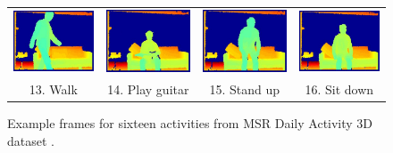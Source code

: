 \documentclass[final,3p,times,twocolumn]{elsarticle}
\begin{document}
\begin{figure}[t]
{\begin{tabular}{cccc}
	        \includegraphics[width=0.4\columnwidth]{Figures/MSRDaily3D_walk.pdf} &		
	        \includegraphics[width=0.4\columnwidth]{Figures/MSRDaily3D_playguitar.pdf} &          \includegraphics[width=0.4\columnwidth]{Figures/MSRDaily3D_standup.pdf} &          \includegraphics[width=0.4\columnwidth]{Figures/MSRDaily3D_sitdown.pdf} \\
	  			
	        13. Walk &         14. Play guitar &          15. Stand up &          16. Sit down \\
	  			
	  	\end{tabular}
    }
	\caption{Example frames for sixteen activities from MSR Daily Activity 3D dataset \cite{wang2012mining}.}
	\label{Figure_ExampleFrames_MSRDaily3D}
\end{figure}
\end{document}
